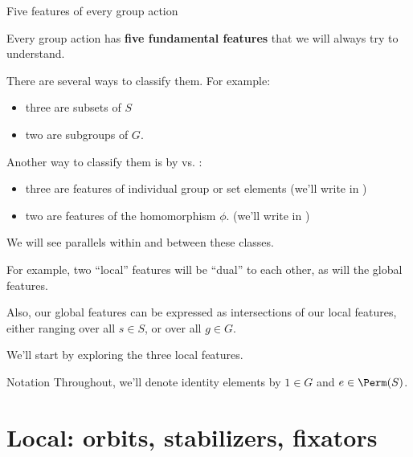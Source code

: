 \documentclass[8pt, handout]{beamer}
\newcommand{\Pause}{}      %
\begin{document}
\begin{frame}{Five features of every group action} %

  Every group action has \textbf{five fundamental features} that we
  will always try to understand. \medskip\Pause

  There are several ways to classify them. For example:
  \begin{itemize}
  \item three are subsets of $S$
  \item two are subgroups of $G$.
  \end{itemize}

  \medskip\Pause
  
  Another way to classify them is by  vs. :
  \begin{itemize}
  \item three are features of individual group or set elements (we'll
    write in )
  \item two are features of the homomorphism $\phi$. (we'll write in
    )
  \end{itemize}

  \medskip\Pause
  
  We will see parallels within and between these classes.
  
  \medskip\Pause
  
  For example, two ``local'' features will be ``dual'' to each
  other, as will the global features.

  \medskip\Pause
  
  Also, our global features can be expressed as intersections of our
  local features, either ranging over all $s\in S$, or over all $g\in
  G$.

  \medskip\Pause
  
  We'll start by exploring the three local features. \medskip\Pause

  \begin{exampleblock}{Notation}
    Throughout, we'll denote identity elements by $1\in G$ and $e\in\Perm(S)$.
  \end{exampleblock}

\end{frame}


\section{Local: orbits, stabilizers, fixators}
\end{document}
